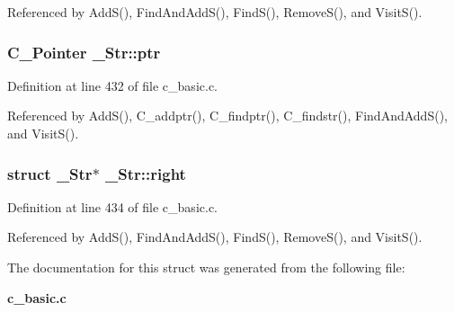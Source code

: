 Referenced by Add\-S(), Find\-And\-Add\-S(), Find\-S(), Remove\-S(), and Visit\-S().
\subsubsection{\setlength{\rightskip}{0pt plus 5cm}\bf{C\_\-Pointer} \bf{\_\-Str::ptr}}\label{struct__Str_2626d2c28528fdc545c1ad981ce5098a}




Definition at line 432 of file c\_\-basic.c.

Referenced by Add\-S(), C\_\-addptr(), C\_\-findptr(), C\_\-findstr(), Find\-And\-Add\-S(), and Visit\-S().
\subsubsection{\setlength{\rightskip}{0pt plus 5cm}struct \bf{\_\-Str}$\ast$ \bf{\_\-Str::right}}\label{struct__Str_ba4c1b00888610540e2242cc1602128b}




Definition at line 434 of file c\_\-basic.c.

Referenced by Add\-S(), Find\-And\-Add\-S(), Find\-S(), Remove\-S(), and Visit\-S().

The documentation for this struct was generated from the following file:\begin{CompactItemize}
\item 
\bf{c\_\-basic.c}\end{CompactItemize}
